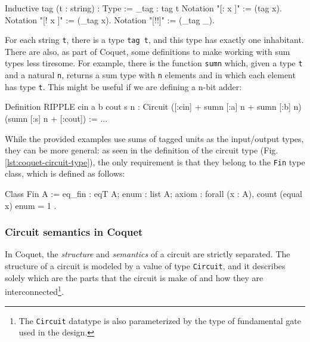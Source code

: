 \documentclass[a4paper]{article}
\begin{document}
                \begin{coqcode}
        Inductive tag (t : string) : Type := _tag : tag t
        Notation "[: x ]" := (tag x).
        Notation "[! x ]" := (_tag x).
        Notation "[!!]"   := (_tag _).
                \end{coqcode}

                For each string \texttt{t}, there is a type \texttt{tag t}, and this type has
                exactly one inhabitant. There are also, as part of Coquet, some definitions to make
                working with sum types less tiresome. For example, there is the function
                \texttt{sumn} which, given a type \texttt{t} and a natural \texttt{n}, returns a
                sum type with \texttt{n} elements and in which each element has type \texttt{t}.
                This might be useful if we are defining a n-bit adder:

                \begin{coqcode}
        Definition RIPPLE cin a b cout s n :
            Circuit  ([:cin] + sumn [:a] n + sumn [:b] n)  (sumn [:s] n + [:cout]) := ...
                \end{coqcode}

                While the provided examples use sums of tagged units as the input/output types, they
                can be more general: as seen in the definition of the circuit type (Fig.
                \ref{lst:coquet-circuit-type}), the only requirement is that they belong to the
                \texttt{Fin} type class, which is defined as follows:

                \begin{coqcode}
        Class Fin A := {
            eq_fin : eqT A;
            enum   : list A;
            axiom  : forall (x : A), count (equal x) enum = 1
        }.
                \end{coqcode}


            \subsubsection{Circuit semantics in Coquet}
            \label{subsubsec:coquet-semantics}
                In Coquet, the \emph{structure} and \emph{semantics} of a circuit are strictly
                separated. The structure of a circuit is modeled by a value of type
                \texttt{Circuit}, and it describes solely which are the parts that the circuit is
                make of and how they are interconnected\footnote{The \texttt{Circuit} datatype is
                    also parameterized by the type of fundamental gate used in the design.}.
\end{document}
